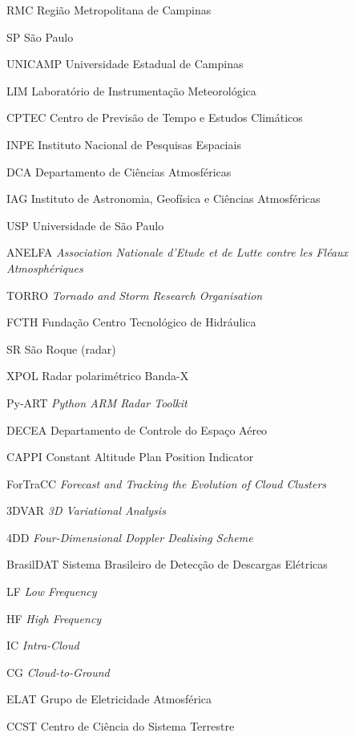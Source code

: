 \begin{siglas}
  \item[RMC] Região Metropolitana de Campinas
  \item[SP] São Paulo
  \item[UNICAMP] Universidade Estadual de Campinas
  \item[LIM] Laboratório de Instrumentação Meteorológica
  \item[CPTEC] Centro de Previsão de Tempo e Estudos Climáticos
  \item[INPE] Instituto Nacional de Pesquisas Espaciais
  \item[DCA] Departamento de Ciências Atmosféricas
  \item[IAG] Instituto de Astronomia, Geofísica e Ciências Atmosféricas
  \item[USP] Universidade de São Paulo
  \item[ANELFA] \textit{Association Nationale d'Etude et de Lutte contre les Fléaux Atmosphériques}
  \item[TORRO] \textit{Tornado and Storm Research Organisation}
  \item[FCTH] Fundação Centro Tecnológico de Hidráulica
  \item[SR] São Roque (radar)
  \item[XPOL] Radar polarimétrico Banda-X
  \item[Py-ART] \textit{Python ARM Radar Toolkit}
  \item[DECEA] Departamento de Controle do Espaço Aéreo
  \item[CAPPI] Constant Altitude Plan Position Indicator
  \item[ForTraCC] \textit{Forecast and Tracking the Evolution of Cloud Clusters}
  \item[3DVAR] \textit{3D Variational Analysis}
  \item[4DD] \textit{Four-Dimensional Doppler Dealising Scheme}
  \item[BrasilDAT] Sistema Brasileiro de Detecção de Descargas Elétricas
  \item[LF] \textit{Low Frequency}
  \item[HF] \textit{High Frequency}
  \item[IC] \textit{Intra-Cloud}
  \item[CG] \textit{Cloud-to-Ground}
  \item[ELAT] Grupo de Eletricidade Atmosférica
  \item[CCST] Centro de Ciência do Sistema Terrestre

\end{siglas}
